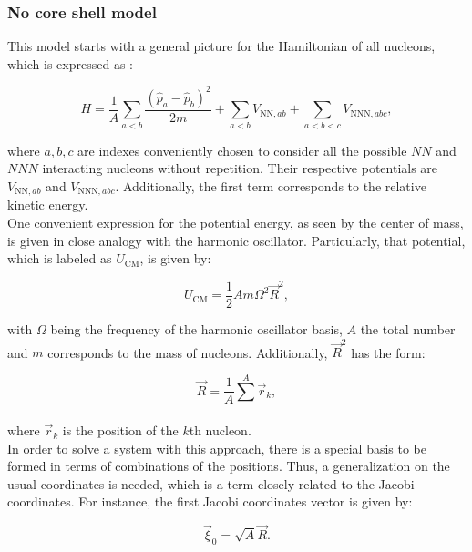 \documentclass[openany]{book}
\begin{document}
\subsubsection{No core shell model} \label{ssub:abInitio_NCSM}

This model starts with a general picture for the Hamiltonian of all nucleons, which is expressed as \cite{barrett_navratil_vary_2013}: 

\begin{equation}\label{eq:micro_NCSM_hamiltonian}
	H = \frac{1}{A} \sum_{a < b} \frac{(\hat p_a - \hat p_b)^2}{2m} + \sum_{a<b} V_{\mathrm{NN}, ab} +  \sum_{a<b < c} V_{\mathrm{NNN}, abc},
\end{equation}

where $a, b, c$ are indexes conveniently chosen to consider all the possible $NN$ and $NNN$ interacting nucleons without repetition. Their respective potentials are $V_{\mathrm{NN}, ab}$ and  $V_{\mathrm{NNN}, abc}$.  Additionally, the first term corresponds to the relative kinetic energy. \\

One convenient expression for the potential energy, as seen by the center of mass, is given in close analogy with the harmonic oscillator. Particularly, that potential, which is labeled as $U_{\mathrm{CM}}$, is given by:

\begin{equation}\label{eq:micro_NCSM_potentialHarmonic}
	U_{\mathrm{CM}} = \frac{1}{2} A m \Omega^2 \vec {R}^2,
\end{equation}

with $\Omega$ being the frequency of the harmonic oscillator basis, $A$ the total number  and $m$ corresponds to the mass of nucleons. Additionally, $\vec {R}^2$ has the form: 

\begin{equation}\label{eq:micro_NCSM_R}
	\vec R = \frac{1}{A}\sum_{}^{A} \vec r_k, 
\end{equation}

where $\vec r_k$ is the position of the $k$th nucleon. \\

In order to solve a system with this approach, there is a special basis to be formed in terms of combinations of the positions. Thus, a generalization on the usual coordinates is needed, which is a term closely related to the Jacobi coordinates. For instance, the first Jacobi coordinates vector is given by: 

\begin{equation}\label{eq:micro_NCSM_jacobi0}
	\vec \xi_0 = \sqrt{A} \vec R.
\end{equation}
\end{document}
